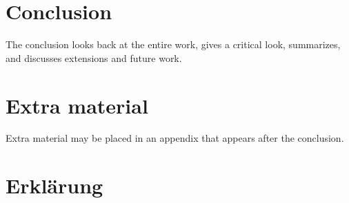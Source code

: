 \documentclass[a4paper,twoside,openright,11pt]{report}
\begin{document}
\chapter{Conclusion}
\label{ch:conclusion}

The conclusion looks back at the entire work, gives a critical look,
summarizes, and discusses extensions and future work.


\appendix
\chapter{Extra material}
\label{app:extra}

Extra material may be placed in an appendix that appears after the conclusion.



\nocite{*}



%
%




\chapter*{Erklärung}
\end{document}
